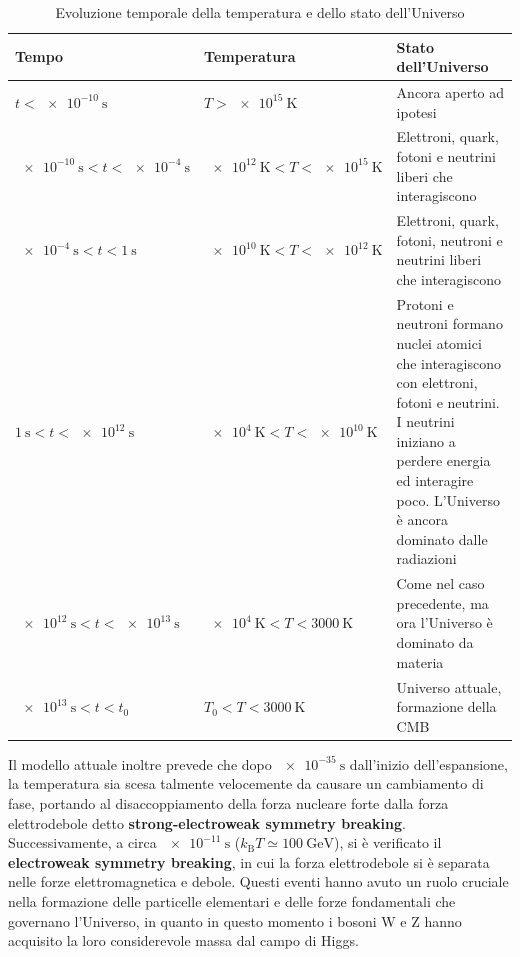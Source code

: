 \begin{table}[H]
    \centering
    \begin{tabular}{p{4cm} p{4cm} p{5cm}}
        \hline
        \textbf{Tempo} & \textbf{Temperatura} & \textbf{Stato dell'Universo} \\
        \hline
        $t < \qty{e-10}{\second}$ & $T > \qty{e15}{\kelvin}$ & Ancora aperto ad ipotesi \\[8pt]
        $\qty{e-10}{\second} < t < \qty{e-4}{\second}$ & $\qty{e12}{\kelvin} < T < \qty{e15}{\kelvin}$ & Elettroni, quark, fotoni e neutrini liberi che interagiscono \\[8pt]
        $\qty{e-4}{\second} < t < \qty{1}{\second}$ & $\qty{e10}{\kelvin} < T < \qty{e12}{\kelvin}$ & Elettroni, quark, fotoni, neutroni e neutrini liberi che interagiscono \\[8pt]
        $\qty{1}{\second} < t < \qty{e12}{\second}$ & $\qty{e4}{\kelvin} < T < \qty{e10}{\kelvin}$ &  Protoni e neutroni formano nuclei atomici che interagiscono con elettroni, fotoni e neutrini. I neutrini iniziano a perdere energia ed interagire poco. L'Universo è ancora dominato dalle radiazioni\\[8pt]
        $\qty{e12}{\second} < t < \qty{e13}{\second}$ & $\qty{e4}{\kelvin} < T < \qty{3000}{\kelvin}$ & Come nel caso precedente, ma ora l'Universo è dominato da materia\\[8pt]
        $\qty{e13}{\second} < t < t_0$ & $T_0 < T < \qty{3000}{\kelvin}$ & Universo attuale, formazione della CMB \\
        \hline
    \end{tabular}
    \caption{Evoluzione temporale della temperatura e dello stato dell'Universo}
\end{table}
Il modello attuale inoltre prevede che dopo $\qty{e-35}{\second}$ dall'inizio dell'espansione, la temperatura sia scesa talmente velocemente da causare un cambiamento di fase, portando al disaccoppiamento della forza nucleare forte dalla forza elettrodebole detto \textbf{strong-electroweak symmetry breaking}. Successivamente, a circa $\qty{e-11}{\second}$ ($k_{\text{B}}T \simeq \qty{100}{\giga\electronvolt}$), si è verificato il \textbf{electroweak symmetry breaking}, in cui la forza elettrodebole si è separata nelle forze elettromagnetica e debole. Questi eventi hanno avuto un ruolo cruciale nella formazione delle particelle elementari e delle forze fondamentali che governano l'Universo, in quanto in questo momento i bosoni W e Z hanno acquisito la loro considerevole massa dal campo di Higgs.\\
